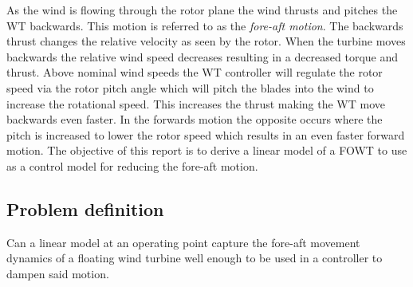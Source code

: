 \smallskip
As the wind is flowing through the rotor plane the wind thrusts and pitches the WT backwards. This motion is referred to as the \textit{fore-aft motion}. The backwards thrust changes the relative velocity as seen by the rotor. When the turbine moves backwards the relative wind speed decreases resulting in a decreased torque and thrust. Above nominal wind speeds the WT controller will regulate the rotor speed via the rotor pitch angle which will pitch the blades into the wind to increase the rotational speed. This increases the thrust making the WT move backwards even faster. In the forwards motion the opposite occurs where the pitch is increased to lower the rotor speed which results in an even faster forward motion. The objective of this report is to derive a linear model of a FOWT to use as a control model for reducing the fore-aft motion. 


\subsection{Problem definition} \label{sec:intro_problemdef}
Can a linear model at an operating point capture the fore-aft movement dynamics of a floating wind turbine well enough to be used in a controller to dampen said motion.